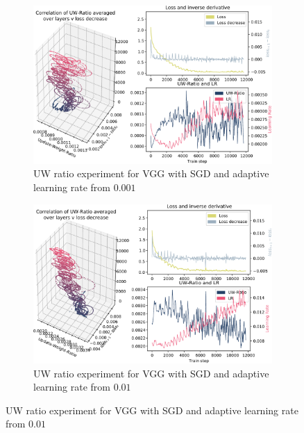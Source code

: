 \begin{figure}
    \begin{subfigure}{\textwidth}
        \centering
        \includegraphics[width=\linewidth]{gfx/diagrams/experiments/ratio_loss_correlation/vgg_sgd_0001_0_11700_ratio_schedule.pdf}
        \caption{UW ratio experiment for VGG with SGD and adaptive learning rate
            from $0.001$}
        \label{fig:ratio_loss_corr_vgg_sgd_0001_adaptive}
    \end{subfigure}

    \begin{subfigure}{\textwidth}
        \centering
        \includegraphics[width=\linewidth]{gfx/diagrams/experiments/ratio_loss_correlation/vgg_sgd_001_0_11700_ratio_schedule.pdf}
        \caption{UW ratio experiment for VGG with SGD and adaptive learning rate
            from $0.01$}
        \label{fig:ratio_loss_corr_vgg_sgd_001_adaptive}
    \end{subfigure}


\end{figure}
